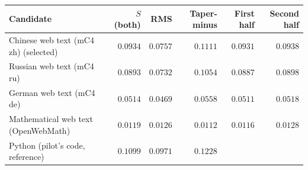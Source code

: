 \begin{tabular}{@{}lrrrrr@{}}
\toprule
Candidate & $S$ (both) & RMS & Taper-minus & First half & Second half \\
\midrule
Chinese web text (mC4 zh) (selected) & $0.0934$ & $0.0757$ & $0.1111$ & $0.0931$ & $0.0938$ \\
Russian web text (mC4 ru) & $0.0893$ & $0.0732$ & $0.1054$ & $0.0887$ & $0.0898$ \\
German web text (mC4 de) & $0.0514$ & $0.0469$ & $0.0558$ & $0.0511$ & $0.0518$ \\
Mathematical web text (OpenWebMath) & $0.0119$ & $0.0126$ & $0.0112$ & $0.0116$ & $0.0128$ \\
\midrule
Python (pilot's code, reference) & $0.1099$ & $0.0971$ & $0.1228$ & & \\
\bottomrule
\end{tabular}
